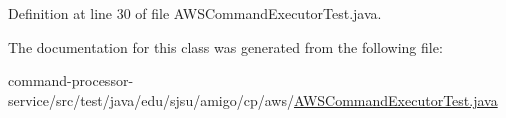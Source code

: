 Definition at line 30 of file A\+W\+S\+Command\+Executor\+Test.\+java.



The documentation for this class was generated from the following file\+:\begin{DoxyCompactItemize}
\item 
command-\/processor-\/service/src/test/java/edu/sjsu/amigo/cp/aws/\hyperlink{_a_w_s_command_executor_test_8java}{A\+W\+S\+Command\+Executor\+Test.\+java}\end{DoxyCompactItemize}
